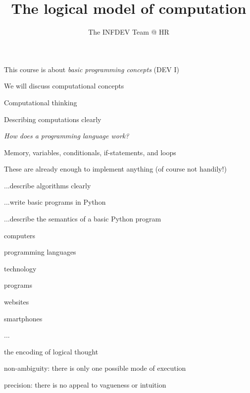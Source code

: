 \documentclass{beamer}
\title{The logical model of computation}
\author{The INFDEV Team @ HR}
\institute{Hogeschool Rotterdam \\ 
Rotterdam, Netherlands}
\date{}
\begin{document}
\maketitle

\begin{slide}{
\item This course is about \textit{basic programming concepts} (DEV I)
\item We will discuss computational concepts
\item Computational thinking
\item Describing computations clearly
}\end{slide}

\begin{slide}{
\item \textit{How does a programming language work?}
\item Memory, variables, conditionals, if-statements, and loops
\item These are already enough to implement anything (of course not handily!)
}\end{slide}

\begin{slide}{
\item ...describe algorithms clearly
\item ...write basic programs in Python
\item ...describe the semantics of a basic Python program
}\end{slide}

\begin{slide}{
\item computers
\item programming languages
\item technology
\item programs
\item websites
\item smartphones
\item ...
}\end{slide}

\begin{slide}{
\item the encoding of logical thought
\item non-ambiguity: there is only one possible mode of execution
\item precision: there is no appeal to vagueness or intuition
}\end{slide}
\end{document}
